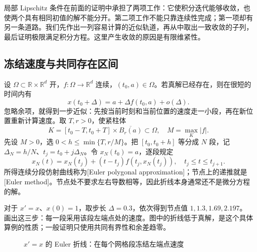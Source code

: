 
局部 Lipschitz 条件在前面的证明中承担了两项工作：它使积分迭代能够收敛，也使两个具有相同初值的解不能分开。第二项工作不能只靠连续性完成；第一项却有另一条道路。我们先作出一列容易计算的近似轨道，再从中取出一致收敛的子列，最后证明极限满足积分方程。这里产生收敛的原因是有限维紧性。

\subsection{冻结速度与共同存在区间}
\label{b2:subsec:ode-euler-polygons}

设 \(\Omega\subset\mathbb R\times\mathbb R^d\) 开，\(f:\Omega\to\mathbb R^d\) 连续，\((t_0,a)\in\Omega\)。若真解已经存在，则在很短的时间内有
\[
 x(t_0+\Delta)=a+\Delta f(t_0,a)+o(\Delta).
\]
忽略余项，就得到一步近似：先按当前时刻和当前位置的速度走一小段，再在新位置重新计算速度。取 \(T,r>0\)，使紧柱体
\[
 K=[t_0-T,t_0+T]\times\overline{B_r(a)}\subset\Omega,
 \quad M=\max_K|f|.
\]
先设 \(M>0\)，选 \(0<h\leq\min\{T,r/M\}\)。把 \([t_0,t_0+h]\) 等分成 \(N\) 段，记 \(\Delta_N=h/N\)、\(t_j=t_0+j\Delta_N\)。令 \(x_N(t_0)=a\)，逐段规定
\begin{equation}\label{b2:eq:ode-euler-polygon}
 x_N(t)=x_N(t_j)+(t-t_j)f(t_j,x_N(t_j)),
 \quad t_j\leq t\leq t_{j+1}.
\end{equation}
所得连续分段仿射曲线称为[Euler polygonal approximation]；节点上的递推就是[Euler method]。节点处不要求左右导数相等，因此折线本身通常还不是微分方程的解。

\ProseParagraphBreak

对于 \(x'=x\)、\(x(0)=1\)，取步长 \(\Delta=0.3\)，依次得到节点值 \(1,1.3,1.69,2.197\)。画出这三步：每一段采用该段左端点处的速度。图中的折线低于真解，是这个具体算例的性质；一般证明只使用共同有界性和余差趋零。

\begin{figure}[htbp]
\centering
{}
\caption{\(x'=x\) 的 Euler 折线：在每个网格段冻结左端点速度}
\label{b2:fig:ode-euler-polygon}
\end{figure}

